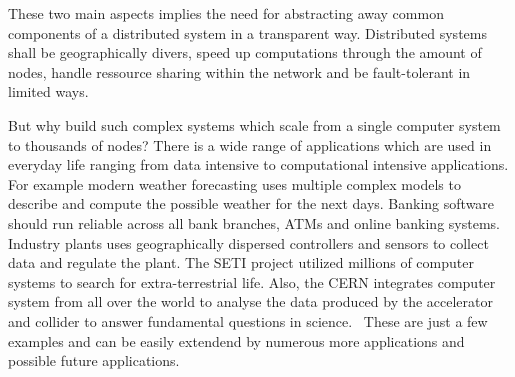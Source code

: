 These two main aspects implies the need for abstracting away common components
of a distributed system in a transparent way. Distributed systems shall be
geographically divers, speed up computations through the amount of nodes,
handle ressource sharing within the network and be fault-tolerant in limited
ways.

But why build such complex systems which scale from a single computer system
to thousands of nodes? There is a wide range of applications which are used in
everyday life ranging from data intensive to computational intensive
applications. For example modern weather forecasting uses multiple complex
models to describe and compute the possible weather for the next days.
Banking software should run reliable across all bank branches, ATMs and
online banking systems. Industry plants uses geographically dispersed
controllers and sensors to collect data and regulate the plant.
The SETI project utilized millions of computer systems to search for
extra-terrestrial life. Also, the CERN integrates computer system from
all over the world to analyse the data produced by the accelerator and
collider to answer fundamental questions in science.~\cite{ghosh2014distributed}
These are just a few examples and can be easily extendend by numerous
more applications and possible future applications.





